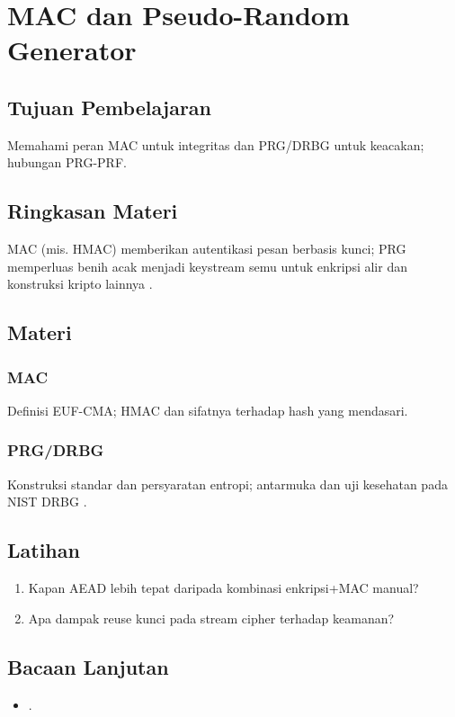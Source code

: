 \documentclass[../main.tex]{subfiles}
\begin{document}
\chapter{MAC dan Pseudo-Random Generator}
\section{Tujuan Pembelajaran}
Memahami peran MAC untuk integritas dan PRG/DRBG untuk keacakan; hubungan PRG-PRF.

\section{Ringkasan Materi}
MAC (mis. HMAC) memberikan autentikasi pesan berbasis kunci; PRG memperluas benih acak menjadi keystream semu untuk enkripsi alir dan konstruksi kripto lainnya \citep{sp80090a,bellare_rogaway_notes}.

\section{Materi}
\subsection{MAC}
Definisi EUF-CMA; HMAC dan sifatnya terhadap hash yang mendasari.

\subsection{PRG/DRBG}
Konstruksi standar dan persyaratan entropi; antarmuka dan uji kesehatan pada NIST DRBG \citep{sp80090a}.

\section{Latihan}
\begin{enumerate}
  \item Kapan AEAD lebih tepat daripada kombinasi enkripsi+MAC manual?
  \item Apa dampak reuse kunci pada stream cipher terhadap keamanan?
\end{enumerate}

\section{Bacaan Lanjutan}
\begin{itemize}
  \item \citep{sp80090a,bellare_rogaway_notes}.
\end{itemize}
\end{document}
